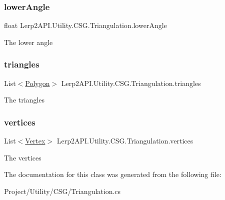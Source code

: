 \subsubsection{\texorpdfstring{lower\+Angle}{lowerAngle}}
{\footnotesize\ttfamily float Lerp2\+A\+P\+I.\+Utility.\+C\+S\+G.\+Triangulation.\+lower\+Angle}



The lower angle 

\mbox{\label{class_lerp2_a_p_i_1_1_utility_1_1_c_s_g_1_1_triangulation_a33bbce81760bb6cd84651088fa09b1d7}} 
\subsubsection{\texorpdfstring{triangles}{triangles}}
{\footnotesize\ttfamily List$<$\hyperlink{class_lerp2_a_p_i_1_1_utility_1_1_c_s_g_1_1_triangulation_1_1_polygon}{Polygon}$>$ Lerp2\+A\+P\+I.\+Utility.\+C\+S\+G.\+Triangulation.\+triangles}



The triangles 

\mbox{\label{class_lerp2_a_p_i_1_1_utility_1_1_c_s_g_1_1_triangulation_adcd2220db9df1a641a9504be92211497}} 
\subsubsection{\texorpdfstring{vertices}{vertices}}
{\footnotesize\ttfamily List$<$\hyperlink{class_lerp2_a_p_i_1_1_utility_1_1_c_s_g_1_1_triangulation_1_1_vertex}{Vertex}$>$ Lerp2\+A\+P\+I.\+Utility.\+C\+S\+G.\+Triangulation.\+vertices}



The vertices 



The documentation for this class was generated from the following file\+:\begin{DoxyCompactItemize}
\item 
Project/\+Utility/\+C\+S\+G/Triangulation.\+cs\end{DoxyCompactItemize}
